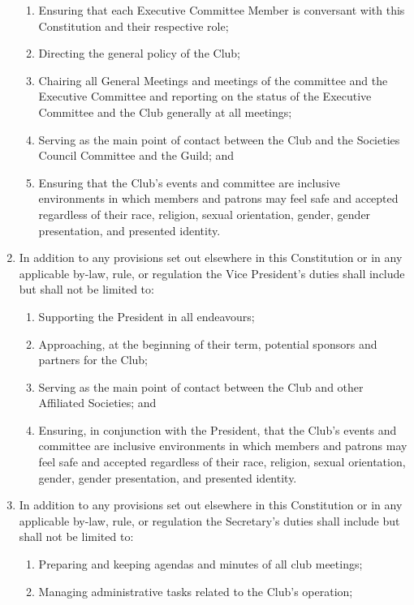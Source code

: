 \documentclass[12pt]{article}
\begin{document}
\begin{enumerate}[label=9.\arabic*]
\begin{enumerate}[label=\theenumi.\arabic*]
        \item Ensuring that each Executive Committee Member is conversant with this Constitution and their respective role;
        \item Directing the general policy of the Club;
        \item Chairing all General Meetings and meetings of the committee and the Executive Committee and reporting on the status of the Executive Committee and the Club generally at all meetings;
        \item Serving as the main point of contact between the Club and the Societies Council Committee and the Guild; and
        \item Ensuring that the Club's events and committee are inclusive environments in which members and patrons may feel safe and accepted regardless of their race, religion, sexual orientation, gender, gender presentation, and presented identity.
    \end{enumerate}
\item In addition to any provisions set out elsewhere in this Constitution or in any applicable by-law, rule, or regulation the Vice President's duties shall include but shall not be limited to:
    \begin{enumerate}[label=\theenumi.\arabic*]
        \item Supporting the President in all endeavours;
        \item Approaching, at the beginning of their term, potential sponsors and partners for the Club;
        \item Serving as the main point of contact between the Club and other Affiliated Societies; and
        \item Ensuring, in conjunction with the President, that the Club's events and committee are inclusive environments in which members and patrons may feel safe and accepted regardless of their race, religion, sexual orientation, gender, gender presentation, and presented identity.
    \end{enumerate}
    \item In addition to any provisions set out elsewhere in this Constitution or in any applicable by-law, rule, or regulation the Secretary's duties shall include but shall not be limited to:
    \begin{enumerate}[label=\theenumi.\arabic*]
        \item Preparing and keeping agendas and minutes of all club meetings;
        \item Managing administrative tasks related to the Club's operation;

\end{enumerate}
\end{enumerate}
\end{document}

